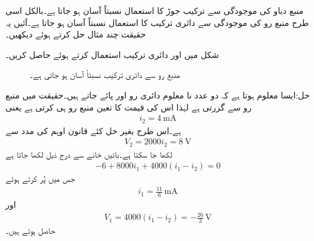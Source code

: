 منبع دباو کی موجودگی سے ترکیب جوڑ کا استعمال نسبتاً آسان ہو جاتا ہے۔بالکل اسی طرح منبع رو کی موجودگی سے دائری ترکیب کا استعمال نسبتاً آسان ہو جاتا ہے۔آئیں یہ حقیقت چند مثال حل کرتے ہوئے دیکھیں۔

شکل  میں  اور  دائری ترکیب استعمال کرتے ہوئے حاصل کریں۔

\begin{figure}
\centering
{}
\caption{منبع رو سے دائری ترکیب نسبتاً آسان ہو جاتی ہے۔}
\label{شکل_جوڑ_منبع_رو_آسان_ترکیب_دائری_الف}
\end{figure}%

حل:ایسا معلوم ہوتا ہے کہ دو عدد نا معلوم دائری رو  اور  پائے جاتے ہیں۔حقیقت میں  منبع رو سے گزرتی ہے لہٰذا اس کی قیمت کا تعین منبع رو ہی کرتی ہے یعنی
\begin{align*}
i_2=\SI{4}{\milli\ampere}
\end{align*}
ہے۔اس طرح بغیر حل کئے قانون اوہم کی مدد سے
\begin{align*}
V_2=2000 i_2=\SI{8}{\volt} 
\end{align*}
لکھا جا سکتا ہے۔بائیں خانے سے درج ذیل لکھا جاتا ہے
\begin{align*}
-6+8000i_1 +4000(i_1-i_2)=0
\end{align*}
جس میں  پُر کرتے ہوئے
\begin{align*}
i_1=\frac{11}{6} \, \si{\milli\ampere}
\end{align*}
اور
\begin{align*}
V_1=4000(i_1-i_2)=-\frac{26}{3} \,\si{\volt}
\end{align*}
حاصل ہوتے ہیں۔

